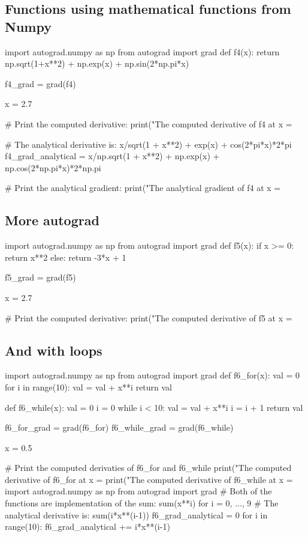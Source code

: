 \documentclass[%
oneside,                 %
final,                   %
10pt]{article}
\begin{document}
\subsection{Functions using mathematical functions from Numpy}

\bpycod
import autograd.numpy as np
from autograd import grad
def f4(x):
    return np.sqrt(1+x**2) + np.exp(x) + np.sin(2*np.pi*x)

f4_grad = grad(f4)

x = 2.7

# Print the computed derivative:
print("The computed derivative of f4 at x = %

# The analytical derivative is: x/sqrt(1 + x**2) + exp(x) + cos(2*pi*x)*2*pi
f4_grad_analytical = x/np.sqrt(1 + x**2) + np.exp(x) + np.cos(2*np.pi*x)*2*np.pi

# Print the analytical gradient:
print("The analytical gradient of f4 at x = %
\epycod


\subsection{More autograd}

\bpycod
import autograd.numpy as np
from autograd import grad
def f5(x):
    if x >= 0:
        return x**2
    else:
        return -3*x + 1

f5_grad = grad(f5)

x = 2.7

# Print the computed derivative:
print("The computed derivative of f5 at x = %
\epycod


\subsection{And  with loops}

\bpycod
import autograd.numpy as np
from autograd import grad
def f6_for(x):
    val = 0
    for i in range(10):
        val = val + x**i
    return val

def f6_while(x):
    val = 0
    i = 0
    while i < 10:
        val = val + x**i
        i = i + 1
    return val

f6_for_grad = grad(f6_for)
f6_while_grad = grad(f6_while)

x = 0.5

# Print the computed derivaties of f6_for and f6_while
print("The computed derivative of f6_for at x = %
print("The computed derivative of f6_while at x = %
\epycod
\bpycod
import autograd.numpy as np
from autograd import grad
# Both of the functions are implementation of the sum: sum(x**i) for i = 0, ..., 9
# The analytical derivative is: sum(i*x**(i-1)) 
f6_grad_analytical = 0
for i in range(10):
    f6_grad_analytical += i*x**(i-1)
\end{document}
